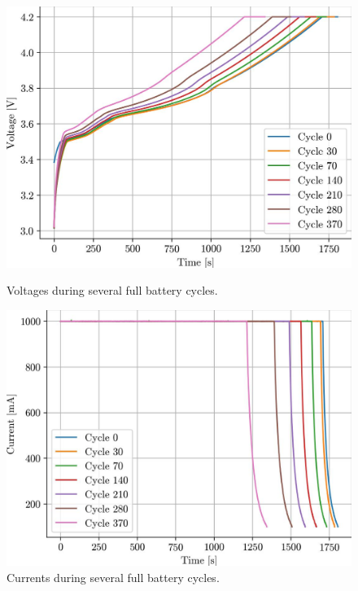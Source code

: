\begin{figure}
\centering
\begin{minipage}{0.49\textwidth}
    \centering
    \includegraphics[width=\linewidth]{figures/12/voltages.jpg}
    \caption{Voltages during several full battery cycles.}
    \label{fig:12-voltages}
\end{minipage}
\hfill
\begin{minipage}{0.49\textwidth}
    \centering
    \includegraphics[width=\linewidth]{figures/12/currents.jpg}
    \caption{Currents during several full battery cycles.}
    \label{fig:12-currents}
\end{minipage}
\end{figure}

